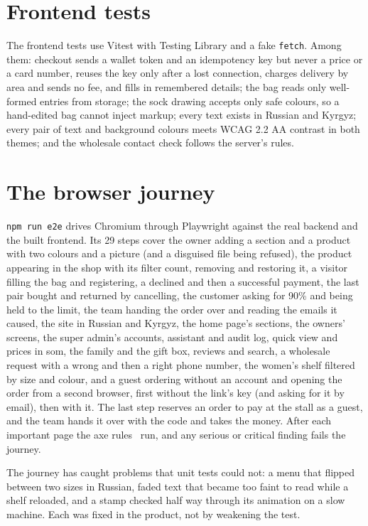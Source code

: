 \section{Frontend tests}

The frontend tests use Vitest with Testing Library and a fake \texttt{fetch}. Among them: checkout sends a wallet
token and an idempotency key but never a price or a card number, reuses the key only after a lost connection, charges
delivery by area and sends no fee, and fills in remembered details; the bag reads only well-formed entries from storage;
the sock drawing accepts only safe colours, so a hand-edited bag cannot inject markup; every text exists in Russian and
Kyrgyz; every pair of text and background colours meets WCAG 2.2 AA contrast in both themes; and the wholesale contact
check follows the server's rules.

\section{The browser journey}

\texttt{npm run e2e} drives Chromium through Playwright against the real backend and the built frontend. Its 29 steps
cover the owner adding a section and a product with two colours and a picture (and a disguised file being refused), the
product appearing in the shop with its filter count, removing and restoring it, a visitor filling the bag and
registering, a declined and then a successful payment, the last pair bought and returned by cancelling, the customer
asking for 90\% and being held to the limit, the team handing the order over and reading the emails it caused, the site in Russian and Kyrgyz, the home
page's sections, the owners' screens, the super admin's accounts, assistant and audit log, quick view and prices in som,
the family and the gift box, reviews and search, a wholesale request with a wrong and then a right phone number, the
women's shelf filtered by size and colour, and a guest ordering without an account and opening the order from a
second browser, first without the link's key (and asking for it by email), then with it. The last step reserves an order to pay at the stall as a guest, and the team hands it over with the code and takes the money. After each important page the axe rules~\cite{axe} run, and any serious or
critical finding fails the journey.

The journey has caught problems that unit tests could not: a menu that flipped between two sizes in Russian, faded text
that became too faint to read while a shelf reloaded, and a stamp checked half way through its animation on a slow
machine. Each was fixed in the product, not by weakening the test.

